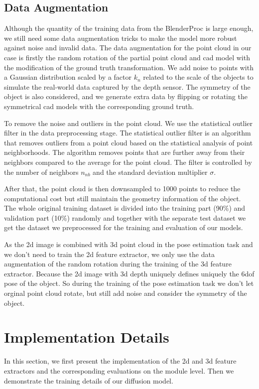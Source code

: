 \documentclass[12pt,DIV14,BCOR12mm,a4paper,footinclude=false,headinclude,parskip=half-,twoside,openright,cleardoublepage=empty,toc=index,bibliography=totoc,listof=totoc]{scrreprt}
\numberwithin{equation}{chapter}
\begin{document}
\subsection{Data Augmentation}
Although the quantity of the training data from the BlenderProc is large enough, we still need some data augmentation tricks to make the model more robust against noise and invalid data. The data augmentation for the point cloud in our case is firstly the random rotation of the partial point cloud and \gls{cad} model with the modification of the ground truth transformation. We add noise to points with a Gaussian distribution scaled by a factor $k_{n}$ related to the scale of the objects to simulate the real-world data captured by the depth sensor. The symmetry of the object is also considered, and we generate extra data by flipping or rotating the symmetrical \gls{cad} models with the corresponding ground truth. 

To remove the noise and outliers in the point cloud. We use the statistical outlier filter in the data preprocessing stage. The statistical outlier filter is an algorithm that removes outliers from a point cloud based on the statistical analysis of point neighborhoods. The algorithm removes points that are further away from their neighbors compared to the average for the point cloud. The filter is controlled by the number of neighbors $n_{nb}$ and the standard deviation multiplier $\sigma$.

After that, the point cloud is then downsampled to 1000 points to reduce the computational cost but still maintain the geometry information of the object. The whole original training dataset is divided into the training part (90\%) and validation part (10\%) randomly and together with the separate test dataset we get the dataset we preprocessed for the training and evaluation of our models.

As the \gls{2d} image is combined with \gls{3d} point cloud in the pose estimation task and we don't need to train the \gls{2d} feature extractor, we only use the data augmentation of the random rotation during the training of the \gls{3d} feature extractor. Because the \gls{2d} image with \gls{3d} depth uniquely defines uniquely the \gls{6dof} pose of the object. So during the training of the pose estimation task we don't let orginal point cloud rotate, but still add noise and consider the symmetry of the object.
\section{Implementation Details}
In this section, we first present the implementation of the \gls{2d} and \gls{3d} feature extractors and the corresponding evaluations on the module level. Then we demonstrate the training details of our diffusion model.
\end{document}
